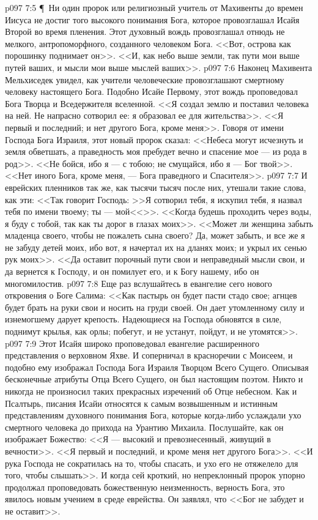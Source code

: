 \vs p097 7:5 \P\ Ни один пророк или религиозный учитель от Махивенты до времен Иисуса не достиг того высокого понимания Бога, которое провозглашал Исайя Второй во время пленения. Этот духовный вождь провозглашал отнюдь не мелкого, антропоморфного, созданного человеком Бога. <<Вот, острова как порошинку поднимает он>>. <<И, как небо выше земли, так пути мои выше путей ваших, и мысли мои выше мыслей ваших>>.
\vs p097 7:6 Наконец Махивента Мельхиседек увидел, как учители человеческие провозглашают смертному человеку настоящего Бога. Подобно Исайе Первому, этот вождь проповедовал Бога Творца и Вседержителя вселенной. <<Я создал землю и поставил человека на ней. Не напрасно сотворил ее: я образовал ее для жительства>>. <<Я первый и последний; и нет другого Бога, кроме меня>>. Говоря от имени Господа Бога Израиля, этот новый пророк сказал: <<Небеса могут исчезнуть и земля обветшать, а праведность моя пребудет вечно и спасение мое --- из рода в род>>. <<Не бойся, ибо я --- с тобою; не смущайся, ибо я --- Бог твой>>. <<Нет иного Бога, кроме меня, --- Бога праведного и Спасителя>>.
\vs p097 7:7 И еврейских пленников так же, как тысячи тысяч после них, утешали такие слова, как эти: <<Так говорит Господь: >>Я сотворил тебя, я искупил тебя, я назвал тебя по имени твоему; ты --- мой<<>>. <<Когда будешь проходить через воды, я буду с тобой, так как ты дорог в глазах моих>>. <<Может ли женщина забыть младенца своего, чтобы не пожалеть сына своего? Да, может забыть, и все же я не забуду детей моих, ибо вот, я начертал их на дланях моих; и укрыл их сенью рук моих>>. <<Да оставит порочный пути свои и неправедный мысли свои, и да вернется к Господу, и он помилует его, и к Богу нашему, ибо он многомилостив.
\vs p097 7:8 Еще раз вслушайтесь в евангелие сего нового откровения о Боге Салима: <<Как пастырь он будет пасти стадо свое; агнцев будет брать на руки свои и носить на груди своей. Он дает утомленному силу и изнемогшему дарует крепость. Надеющиеся на Господа обновятся в силе, поднимут крылья, как орлы; побегут, и не устанут, пойдут, и не утомятся>>.
\vs p097 7:9 Этот Исайя широко проповедовал евангелие расширенного представления о верховном Яхве. И соперничал в красноречии с Моисеем, и подобно ему изображал Господа Бога Израиля Творцом Всего Сущего. Описывая бесконечные атрибуты Отца Всего Сущего, он был настоящим поэтом. Никто и никогда не произносил таких прекрасных изречений об Отце небесном. Как и Псалтырь, писания Исайи относятся к самым возвышенным и истинным представлениям духовного понимания Бога, которые когда\hyp{}либо услаждали ухо смертного человека до прихода на Урантию Михаила. Послушайте, как он изображает Божество: <<Я --- высокий и превознесенный, живущий в вечности>>. <<Я первый и последний, и кроме меня нет другого Бога>>. <<И рука Господа не сократилась на то, чтобы спасать, и ухо его не отяжелело для того, чтобы слышать>>. И когда сей кроткий, но непреклонный пророк упорно продолжал проповедовать божественную неизменность, верность Бога, это явилось новым учением в среде еврейства. Он заявлял, что <<Бог не забудет и не оставит>>.
